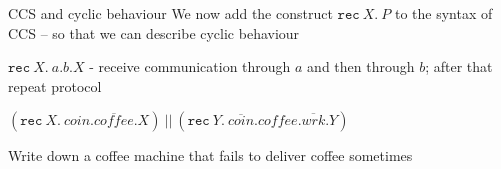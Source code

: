 \documentclass{beamer}
\begin{document}
\begin{frame}{CCS and cyclic behaviour}
  We now add the construct \alert{$\mathtt{rec}\ X.\ P$} to the syntax of CCS -- so that we
  can describe cyclic behaviour

  \vfill
  \begin{example}
    $\mathtt{rec}\ X.\ a . b . X$  - receive communication through $a$ and then
    through $b$; after that repeat protocol
  \end{example}

  \begin{example}
    $(\mathtt{rec}\ X.\ coin . \overline{coffee} . X)\ ||\ (\mathtt{rec}\ Y.\
    \overline{coin} .  coffee . \overline{wrk}. Y)$
  \end{example}

  \vfill
  Write down a coffee machine that fails to deliver coffee sometimes
\end{frame}
\end{document}
